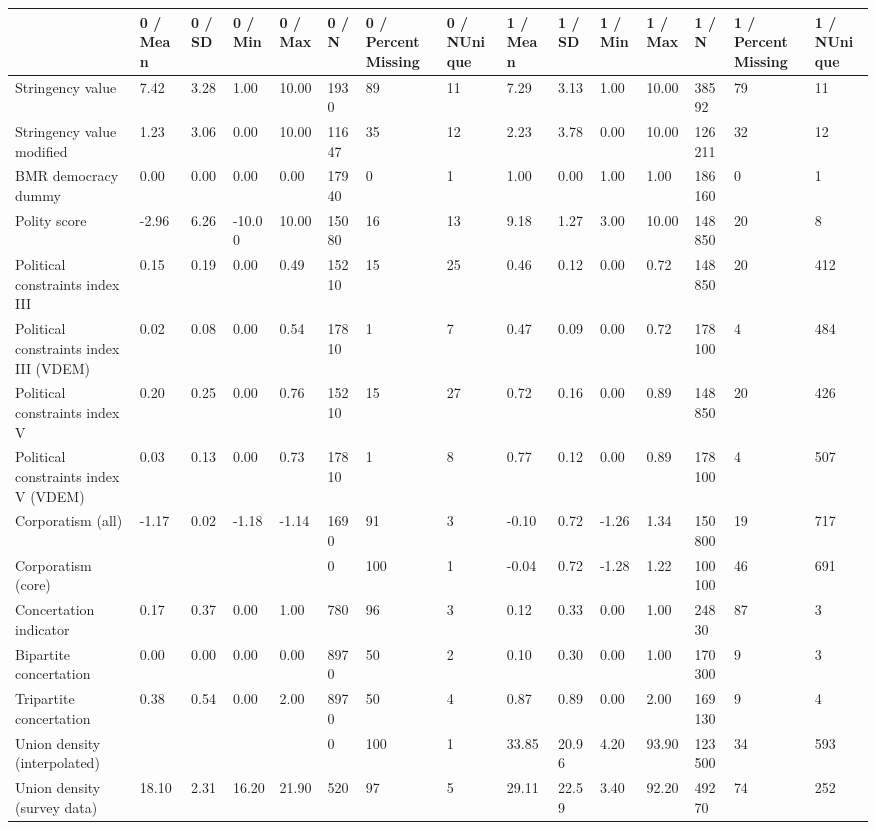
\begin{longtable}{lllllllllllllll}
\toprule
  & 0 / Mean & 0 / SD & 0 / Min & 0 / Max & 0 / N & 0 / PercentMissing & 0 / NUnique & 1 / Mean & 1 / SD & 1 / Min & 1 / Max & 1 / N & 1 / PercentMissing & 1 / NUnique\\
\midrule
Stringency value & 7.42 & 3.28 & 1.00 & 10.00 & 1930 & 89 & 11 & 7.29 & 3.13 & 1.00 & 10.00 & 38592 & 79 & 11\\
Stringency value modified & 1.23 & 3.06 & 0.00 & 10.00 & 11647 & 35 & 12 & 2.23 & 3.78 & 0.00 & 10.00 & 126211 & 32 & 12\\
BMR democracy dummy & 0.00 & 0.00 & 0.00 & 0.00 & 17940 & 0 & 1 & 1.00 & 0.00 & 1.00 & 1.00 & 186160 & 0 & 1\\
Polity score & -2.96 & 6.26 & -10.00 & 10.00 & 15080 & 16 & 13 & 9.18 & 1.27 & 3.00 & 10.00 & 148850 & 20 & 8\\
Political constraints index III & 0.15 & 0.19 & 0.00 & 0.49 & 15210 & 15 & 25 & 0.46 & 0.12 & 0.00 & 0.72 & 148850 & 20 & 412\\
\addlinespace
Political constraints index III (VDEM) & 0.02 & 0.08 & 0.00 & 0.54 & 17810 & 1 & 7 & 0.47 & 0.09 & 0.00 & 0.72 & 178100 & 4 & 484\\
Political constraints index V & 0.20 & 0.25 & 0.00 & 0.76 & 15210 & 15 & 27 & 0.72 & 0.16 & 0.00 & 0.89 & 148850 & 20 & 426\\
Political constraints index V (VDEM) & 0.03 & 0.13 & 0.00 & 0.73 & 17810 & 1 & 8 & 0.77 & 0.12 & 0.00 & 0.89 & 178100 & 4 & 507\\
Corporatism (all) & -1.17 & 0.02 & -1.18 & -1.14 & 1690 & 91 & 3 & -0.10 & 0.72 & -1.26 & 1.34 & 150800 & 19 & 717\\
Corporatism (core) &  &  &  &  & 0 & 100 & 1 & -0.04 & 0.72 & -1.28 & 1.22 & 100100 & 46 & 691\\
\addlinespace
Concertation indicator & 0.17 & 0.37 & 0.00 & 1.00 & 780 & 96 & 3 & 0.12 & 0.33 & 0.00 & 1.00 & 24830 & 87 & 3\\
Bipartite concertation & 0.00 & 0.00 & 0.00 & 0.00 & 8970 & 50 & 2 & 0.10 & 0.30 & 0.00 & 1.00 & 170300 & 9 & 3\\
Tripartite concertation & 0.38 & 0.54 & 0.00 & 2.00 & 8970 & 50 & 4 & 0.87 & 0.89 & 0.00 & 2.00 & 169130 & 9 & 4\\
Union density (interpolated) &  &  &  &  & 0 & 100 & 1 & 33.85 & 20.96 & 4.20 & 93.90 & 123500 & 34 & 593\\
Union density (survey data) & 18.10 & 2.31 & 16.20 & 21.90 & 520 & 97 & 5 & 29.11 & 22.59 & 3.40 & 92.20 & 49270 & 74 & 252\\

\end{longtable}
